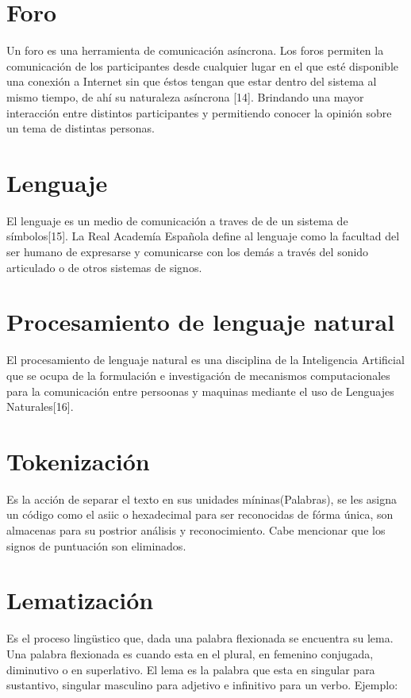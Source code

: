 \section{Foro}
Un foro es una herramienta de comunicación asíncrona. Los  foros permiten la comunicación de los participantes desde cualquier lugar en el que  esté  disponible  una  conexión  a Internet  sin  que  éstos  tengan  que  estar dentro del sistema al mismo tiempo, de ahí su naturaleza asíncrona [14]. Brindando una mayor interacción entre distintos participantes y permitiendo conocer la opinión sobre un tema de distintas personas.


\section{Lenguaje}
El lenguaje es un medio de comunicación a traves de de un sistema de símbolos[15].
La Real Academía Española define al lenguaje como la facultad del ser humano de expresarse y comunicarse con los demás a través del sonido articulado o de otros sistemas de signos.

\section{Procesamiento de lenguaje natural}
El procesamiento de lenguaje natural es una disciplina de la Inteligencia Artificial que se ocupa de la formulación e investigación de mecanismos computacionales para la comunicación entre persoonas y maquinas mediante el uso de Lenguajes Naturales[16].

\section{Tokenización}


Es la acción de separar el texto en sus unidades míninas(Palabras), se les
asigna un código como el asiic o hexadecimal para ser reconocidas de fórma
única, son almacenas para su postrior análisis y reconocimiento. Cabe mencionar que los
signos de puntuación son eliminados.

\section{Lematización}

Es el proceso lingüstico que, dada una palabra flexionada se encuentra su
lema. Una palabra flexionada es cuando esta en el plural, en femenino conjugada,
diminutivo o en superlativo. El lema es la palabra que esta en singular para
sustantivo, singular masculino para adjetivo e infinitivo para un verbo. Ejemplo:

